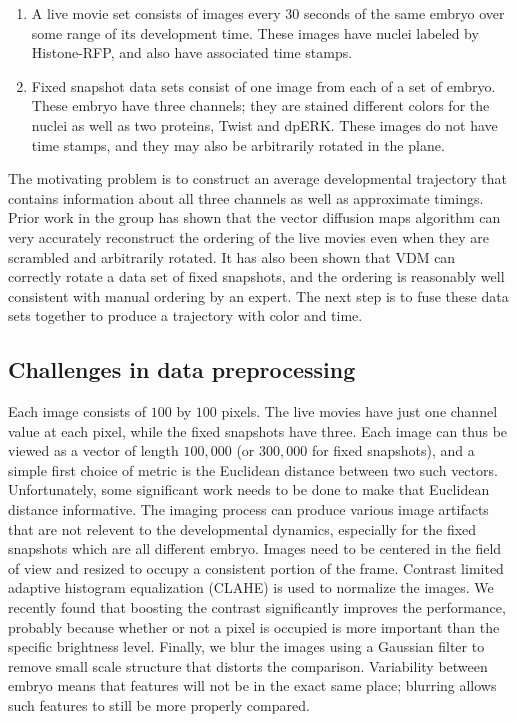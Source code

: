 \documentclass[12pt]{article}
\begin{document}
\begin{enumerate}
\item A live movie set consists of images every 30 seconds of the same embryo over some range of its development time. These images have nuclei labeled by Histone-RFP, and also have associated time stamps.
\item Fixed snapshot data sets consist of one image from each of a set of embryo. These embryo have three channels; they are stained different colors for the nuclei as well as two proteins, Twist and dpERK. These images do not have time stamps, and they may also be arbitrarily rotated in the plane.
\end{enumerate}

The motivating problem is to construct an average developmental trajectory that contains information about all three channels as well as approximate timings. Prior work in the group has shown that the vector diffusion maps algorithm can very accurately reconstruct the ordering of the live movies even when they are scrambled and arbitrarily rotated. It has also been shown that VDM can correctly rotate a data set of fixed snapshots, and the ordering is reasonably well consistent with manual ordering by an expert. The next step is to fuse these data sets together to produce a trajectory with color and time.

\subsection{Challenges in data preprocessing}

Each image consists of $100$ by $100$ pixels.  The live movies have just one channel value at each pixel, while the fixed snapshots have three. Each image can thus be viewed as a vector of length $100,000$ (or $300,000$ for fixed snapshots), and a simple first choice of metric is the Euclidean distance between two such vectors. Unfortunately, some significant work needs to be done to make that Euclidean distance informative. The imaging process can produce various image artifacts that are not relevent to the developmental dynamics, especially for the fixed snapshots which are all different embryo. Images need to be centered in the field of view and resized to occupy a consistent portion of the frame. Contrast limited adaptive histogram equalization (CLAHE) is used to normalize the images. We recently found that boosting the contrast significantly improves the performance, probably because whether or not a pixel is occupied is more important than the specific brightness level. Finally, we blur the images using a Gaussian filter to remove small scale structure that distorts the comparison. Variability between embryo means that features will not be in the exact same place; blurring allows such features to still be more properly compared.
\end{document}
